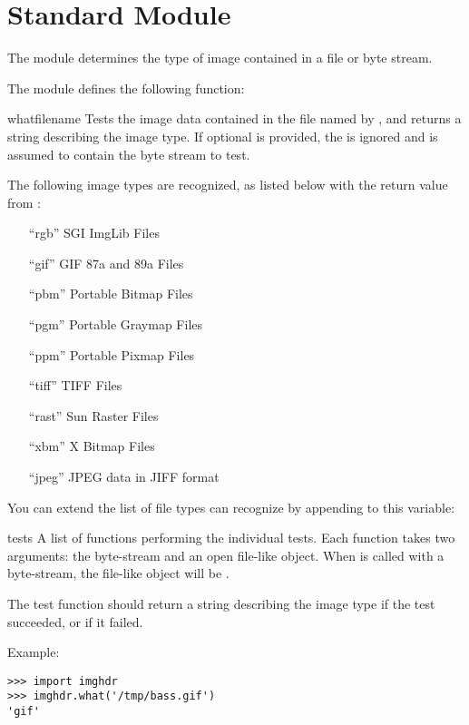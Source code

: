 \section{Standard Module }
\label{module-imghdr}

The  module determines the type of image contained in a
file or byte stream.

The  module defines the following function:


\begin{funcdesc}{what}{filename}
Tests the image data contained in the file named by ,
and returns a string describing the image type.  If optional 
is provided, the  is ignored and  is assumed to
contain the byte stream to test.
\end{funcdesc}

The following image types are recognized, as listed below with the
return value from :

\begin{enumerate}
\item[``rgb''] SGI ImgLib Files

\item[``gif''] GIF 87a and 89a Files

\item[``pbm''] Portable Bitmap Files

\item[``pgm''] Portable Graymap Files

\item[``ppm''] Portable Pixmap Files

\item[``tiff''] TIFF Files

\item[``rast''] Sun Raster Files

\item[``xbm''] X Bitmap Files

\item[``jpeg''] JPEG data in JIFF format
\end{enumerate}

You can extend the list of file types  can recognize by
appending to this variable:

\begin{datadesc}{tests}
A list of functions performing the individual tests.  Each function
takes two arguments: the byte-stream and an open file-like object.
When  is called with a byte-stream, the file-like
object will be .

The test function should return a string describing the image type if
the test succeeded, or  if it failed.
\end{datadesc}

Example:

\begin{verbatim}
>>> import imghdr
>>> imghdr.what('/tmp/bass.gif')
'gif'
\end{verbatim}
